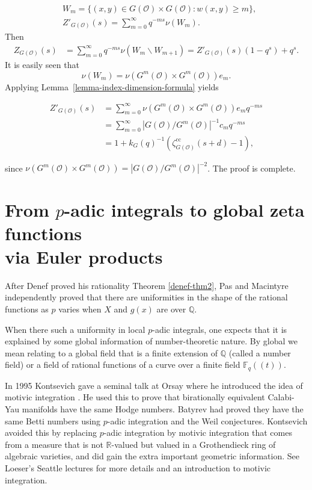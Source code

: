 \documentclass[12pt]{amsart}
\def\R{\mathbb{R}}
\def\F{\mathbb{F}}
\def\cc{\mathrm{cc}}
\def\R{\mathbb{R}}
\def\Q{\mathbb{Q}}
\def\F{\mathbb{F}}
\def\cO{\mathcal{O}}
\numberwithin{equation}{section}
\begin{document}
\[
\begin{split}
&W_m =\{({x},{y})\in G(\cO)\times G(\cO): w({x},{y})\geq m \},\\
&Z'_{G(\cO)}(s)=\sum_{m=0}^\infty q^{-ms}\nu(W_m).
\end{split}
\]
Then
\begin{align*}Z_{G(\cO)}(s)& = \sum_{m=0}^\infty q^{-ms}\nu(W_m \smallsetminus W_{m+1})=
Z'_{G(\cO)}(s)(1-q^s)+q^s.
\end{align*}
It is easily seen that 
$$\nu(W_m)=\nu(G^m(\cO)\times G^m(\cO))e_m.$$ 
Applying Lemma~\ref{lemma-index-dimension-formula} yields

\begin{align*}
Z'_{G(\cO)}(s)&=\sum_{m=0}^{\infty} \nu (G^m(\cO)\times
G^m(\cO)) e_m q^{-ms}\\
&= \sum_{m=0}^{\infty} |G(\cO)/G^m(\cO)|^{-1}c_mq^{-ms}\\
&=1+k_G(q)^{-1}(\zeta_{G(\cO)}^{\cc}(s+d)-1),
\end{align*}

since $\nu(G^m(\cO)\times G^m(\cO))=|G(\cO)/ G^m(\cO)|^{-2}$. The proof is complete.

\section{\bf From $p$-adic integrals to global zeta functions\\ via Euler products}\label{euler}

After Denef proved his rationality Theorem \ref{denef-thm2}, Pas \cite{pas} and Macintyre \cite{Macintyre2} independently proved that there are uniformities in the shape of the rational functions as $p$ varies when $X$ and $g(x)$ are over $\Q$. 

When there such a uniformity in local $p$-adic integrals, one expects that it is explained by some 
global information of number-theoretic nature. By global we mean relating to a global field that is a finite extension of 
$\Q$ (called a number field) or a field of rational functions of a curve over a finite field $\F_q((t))$.

In 1995 Kontsevich gave a seminal talk at Orsay where he introduced the idea of motivic integration \cite{maxim-talk}. He used this to prove that birationally equivalent Calabi-Yau manifolds have the same Hodge numbers. Batyrev had proved they have the same Betti numbers using $p$-adic integration and the Weil conjectures. Kontsevich avoided this by replacing $p$-adic integration by motivic integration that comes from a measure that is not $\R$-valued but valued in a Grothendieck ring of algebraic varieties, and did gain the extra important geometric information. See Loeser's Seattle lectures \cite{francois-surv} for more details and an introduction to motivic integration.
\end{document}
